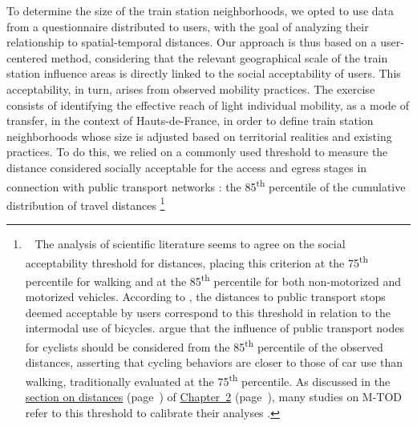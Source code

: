 \begin{refsegment}
To determine the size of the train station neighborhoods, we opted to use data from a questionnaire distributed to users, with the goal of analyzing their relationship to spatial-temporal distances. Our approach is thus based on a user-centered method, considering that the relevant geographical scale of the train station influence areas is directly linked to the social acceptability of users. This acceptability, in turn, arises from observed mobility practices. The exercise consists of identifying the effective reach of light individual mobility, as a mode of transfer, in the context of Hauts-de-France, in order to define train station neighborhoods whose size is adjusted based on territorial realities and existing practices. To do this, we relied on a commonly used threshold to measure the distance considered socially acceptable for the \gls{access} and \gls{egress} stages in connection with public transport networks \textcolor{blue}{\autocite[5]{li_exploring_2021}}: the 85\textsuperscript{th} percentile of the cumulative distribution of travel distances \textcolor{blue}{\autocite[982]{lee_bicycle-based_2016}}\footnote{~
    The analysis of scientific literature seems to agree on the social acceptability threshold for distances, placing this criterion at the 75\textsuperscript{th} percentile for walking and at the 85\textsuperscript{th} percentile for both non-motorized and motorized vehicles. According to \textcolor{blue}{\textcite[5]{zuo_determining_2018}}, the distances to public transport stops deemed acceptable by users correspond to this threshold in relation to the intermodal use of bicycles. \textcolor{blue}{\textcite[982]{lee_bicycle-based_2016}} argue that the influence of public transport nodes for cyclists should be considered from the 85\textsuperscript{th} percentile of the observed distances, asserting that cycling behaviors are closer to those of car use than walking, traditionally evaluated at the 75\textsuperscript{th} percentile. As discussed in the \hyperref[chap2:distances-premiers-derniers-km]{section on distances} (page~\pageref{chap2:distances-premiers-derniers-km}) of \hyperref[chap2:titre]{Chapter~2} (page~\pageref{chap2:titre}), many studies on \acrshort{M-TOD} refer to this threshold to calibrate their analyses \textcolor{blue}{\autocites[4]{hu_examining_2022}[3491]{li_exploring_2017}[64]{ma_understanding_2018}[62]{rabaud_quand_2022}}.
}
\end{refsegment}
